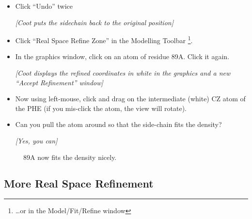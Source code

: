 \documentclass{article}
\begin{document}
\begin{itemize}
\item Click \textsf{``Undo''} twice

  \textsl{ [Coot puts the sidechain back to the original position] } 
  
\item Click \textsf{``Real Space Refine Zone''} in the
  Modelling Toolbar \footnote{\ldots or in the Model/Fit/Refine window}.
  
\item In the graphics window, click on an atom of residue 89A.  Click
  it again.

  \textsl{ [Coot displays the refined coordinates in white in the
    graphics and a new ``Accept Refinement'' window]}
  
\item Now using left-mouse, click and drag on the intermediate (white)
  CZ atom of the PHE (if you mis-click the atom, the view will
  rotate).
  
\item Can you pull the atom around so that the side-chain fits the
  density?

  \emph{ [Yes, you can] } 

\end{itemize}
  
  \begin{figure}[htbp]
    \begin{center}
      \leavevmode
      \epsfxsize 70mm
      \caption{89A now fits the density nicely.}
      \label{fig:89a-coot}
    \end{center}
  \end{figure}

\subsection{More Real Space Refinement}
\end{document}
